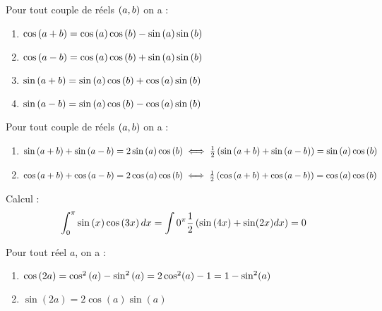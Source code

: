 \begin{formu} 
	Pour tout couple de réels \(\left(a,b\right)\) on a :
	\begin{enumerate}
		\item \( \cos\left(a+b\right) = \cos\left(a\right) \cos\left(b\right) - \sin\left(a\right) \sin\left(b\right) \) \\
		\item \( \cos\left(a-b\right) = \cos\left(a\right) \cos\left(b\right) + \sin\left(a\right) \sin\left(b\right) \)\\
		\item \( \sin\left(a+b\right) = \sin\left(a\right) \cos\left(b\right) + \cos\left(a\right) \sin\left(b\right) \) \\
		\item \( \sin\left(a-b\right) = \sin\left(a\right) \cos\left(b\right) - \cos\left(a\right) \sin\left(b\right) \)\\
	\end{enumerate}
\end{formu}

\begin{formu}
	Pour tout couple de réels \(\left(a,b\right)\) on a :
	\begin{enumerate}
		\item \( \sin\left(a+b\right) + \sin\left(a-b\right) = 2\sin\left(a\right) \cos\left(b\right) \iff \frac{1}{2}\left(\sin\left(a+b\right) + \sin\left(a-b\right)\right) = \sin\left(a\right) \cos\left(b\right)\) \\
		\item \( \cos\left(a+b\right) + \cos\left(a-b\right) = 2\cos\left(a\right) \cos\left(b\right) \iff \frac{1}{2}\left(\cos\left(a+b\right) + \cos\left(a-b\right)\right) = \cos\left(a\right) \cos\left(b\right)\)

	\end{enumerate}

\end{formu}

\begin{appl}
	Calcul : \[\int_{0}^{\pi} \sin\left(x\right) \cos\left(3x\right) dx = \int{0}^{\pi} \frac{1}{2} \left(\sin\left(4x\right)+\sin(2x) dx\right) = 0\]
\end{appl}

\begin{formu}
	Pour tout réel \(a\), on a :
	\begin{enumerate}
		\item \(\cos\left(2a\right) = \cos^2\left(a\right) - \sin^2\left(a\right) = 2\cos^2(a)-1 = 1-\sin^2(a) \)
		\item \(\sin(2a) = 2\cos(a)\sin(a) \)
	\end{enumerate}
\end{formu}

